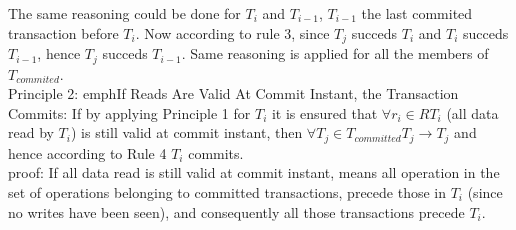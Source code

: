 \documentclass[a4paper, 11pt]{article}
\begin{document}
The same reasoning could be done for $T_i$ and $T_{i-1}$, $T_{i-1}$ the last commited transaction before $T_{i}$. Now according to rule 3, since $T_j$ succeds $T_i$ and $T_i$ succeds $T_{i-1}$, hence $T_j$ succeds $T_{i-1}$. Same reasoning is applied for all the members of $T_{commited}$. \\ 

Principle 2: emph{If Reads Are Valid At Commit Instant, the Transaction Commits}: If by applying Principle 1 for $T_i$ it is ensured that $\forall r_i \in R{T_i}$ (all data read by $T_i$) is still valid at commit instant, then $\forall T_j \in T_{committed} T_j \rightarrow T_j$ and hence according to Rule 4 $T_i$ commits.\\

proof: If all data read is still valid at commit instant, means all operation in the set of operations belonging to committed transactions, precede those in $T_i$ (since no writes have been seen), and consequently all those transactions precede $T_i$.\\ 







\end{document}
